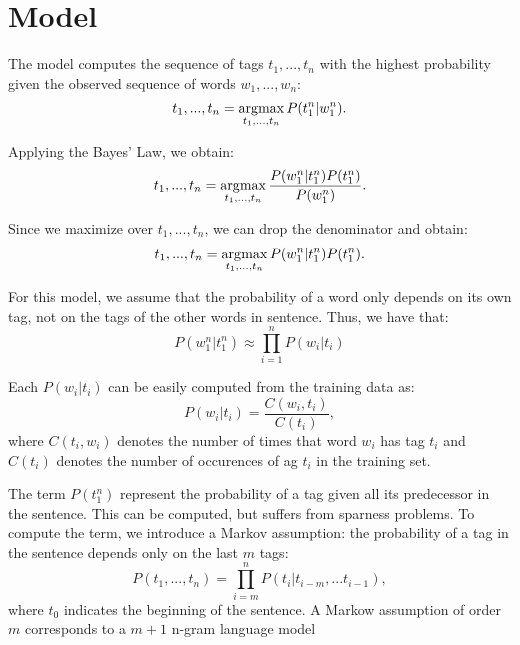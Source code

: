 \section{Model}
\label{sec:model}

The model computes the sequence of tags $t_1, ..., t_n$ with the highest probability given the observed sequence of words 
$w_1, ..., w_n$:
\begin{equation*}
    t_1, ..., t_n = \operatorname*{arg\!\max}_{t_1, ..., t_n} P(t_1^n | w_1^n).
\end{equation*}

Applying the Bayes' Law, we obtain:
\begin{equation*}
    t_1, ..., t_n = \operatorname*{arg\!\max}_{t_1, ..., t_n} \frac{P(w_1^n | t_1^n) P(t_1^n)}{P(w_1^n)}.
\end{equation*}

Since we maximize over $t_1, ..., t_n$, we can drop the denominator and obtain:
\begin{equation}
    t_1, ..., t_n = \operatorname*{arg\!\max}_{t_1, ..., t_n} P(w_1^n | t_1^n) P(t_1^n).
\end{equation}

For this model, we assume that the probability of a word only depends on its own tag,
not on the tags of the other words in sentence.
Thus, we have that:
\begin{equation}
    P(w_1^n | t_1^n) \approx \prod_{i=1}^n P(w_i | t_i) 
\end{equation}

Each $P(w_i | t_i)$ can be easily computed from the training data as:
\begin{equation}
    P(w_i | t_i) = \frac{C(w_i, t_i)}{C(t_i)},
\end{equation}
where $C(t_i, w_i)$ denotes the number of times that word $w_i$ has tag $t_i$ 
and $C(t_i)$ denotes the number of occurences of  ag $t_i$ in the training set.

The term $P(t_1^n)$ represent the probability of a tag given all its predecessor in the sentence.
This can be computed, but suffers from sparness problems.
To compute the term, we introduce a Markov assumption: the probability of a tag in the sentence
depends only on the last $m$ tags:
\begin{equation}
    P(t_1, ..., t_n) = \prod_{i=m}^n P(t_i | t_{i-m}, ... t_{i-1}),
\end{equation}
where $t_0$ indicates the beginning of the sentence.
A Markow assumption of order $m$ corresponds to a $m+1$ n-gram language model

